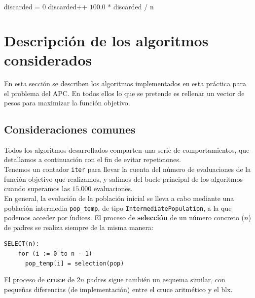 \documentclass[12pt]{article}
\begin{document}
\vspace{-1em}

\begin{algorithm}[h!]
\begin{algorithmic}

    \State discarded = $0$
      
            \State discarded++
        \EndIf       
    \EndFor
    \State \Return $100.0$ * discarded / n
\EndFunction
  
\end{algorithmic}
\end{algorithm}


\newpage
\section{Descripción de los algoritmos considerados}
En esta sección se describen los algoritmos implementados en esta práctica para el problema del APC. En todos ellos lo que se pretende es rellenar un vector de pesos para maximizar la función objetivo.

\subsection*{Consideraciones comunes}
\label{comunes}

Todos los algoritmos desarrollados comparten una serie de comportamientos, que detallamos a continuación con el fin de evitar repeticiones.\\

Tenemos un contador \verb|iter| para llevar la cuenta del número de evaluaciones de la función objetivo que realizamos, y salimos del bucle principal de los algoritmos cuando superamos las $15.000$ evaluaciones.\\

En general, la evolución de la población inicial se lleva a cabo mediante una población intermedia \verb|pop_temp|, de tipo \verb|IntermediatePopulation|, a la que podemos acceder por índices. El proceso de \textbf{selección} de un número concreto ($n$) de padres se realiza siempre de la misma manera:

\begin{verbatim}
SELECT(n):
    for (i := 0 to n - 1)
      pop_temp[i] = selection(pop)
\end{verbatim}

El proceso de \textbf{cruce} de $2n$ padres sigue también un esquema similar, con pequeñas diferencias (de implementación) entre el cruce aritmético y el blx.
\end{document}
